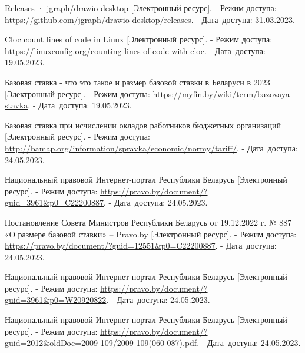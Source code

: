 \begin{thebibliography}{}
    Releases · jgraph/drawio-desktop
    [Электронный ресурс].
    - Режим доступа: \url{https://github.com/jgraph/drawio-desktop/releases}.
    - Дата~доступа: 31.03.2023.

    Cloc count lines of code in Linux
    [Электронный ресурс].
    - Режим доступа: \url{https://linuxconfig.org/counting-lines-of-code-with-cloc}.
    - Дата~доступа: 19.05.2023.

    Базовая ставка - что это такое и размер базовой ставки в Беларуси в 2023
    [Электронный ресурс].
    - Режим доступа: \url{https://myfin.by/wiki/term/bazovaya-stavka}.
    - Дата~доступа: 19.05.2023.

    Базовая ставка при исчислении окладов работников бюджетных организаций
    [Электронный ресурс].
    - Режим доступа: \url{http://bamap.org/information/spravka/economic/normy/tariff/}.
    - Дата~доступа: 24.05.2023.

    Национальный правовой Интернет-портал Республики Беларусь
    [Электронный ресурс].
    - Режим доступа: \url{https://pravo.by/document/?guid=3961&p0=C22200887}.
    - Дата~доступа: 24.05.2023.

    Постановление Совета Министров Республики Беларусь от 19.12.2022 г. № 887 «О размере базовой ставки» – Pravo.by
    [Электронный ресурс].
    - Режим доступа: \url{https://pravo.by/document/?guid=12551&p0=C22200887}.
    - Дата~доступа: 24.05.2023.

    Национальный правовой Интернет-портал Республики Беларусь
    [Электронный ресурс].
    - Режим доступа: \url{https://pravo.by/document/?guid=3961&p0=W20920822}.
    - Дата~доступа: 24.05.2023.

    Национальный правовой Интернет-портал Республики Беларусь
    [Электронный ресурс].
    - Режим доступа: \url{https://pravo.by/document/?guid=2012&oldDoc=2009-109/2009-109(060-087).pdf}.
    - Дата~доступа: 24.05.2023.



\end{thebibliography}
